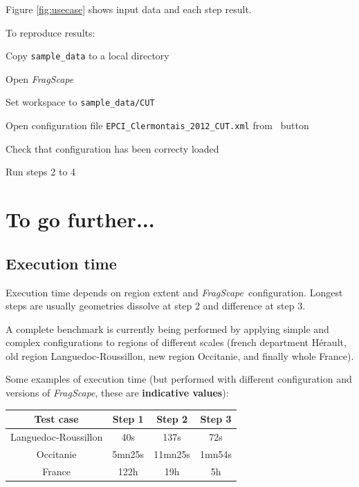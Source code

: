 \documentclass[11pt]{article}
\newcommand{\tool}{\emph{FragScape}}
\let\tempone\itemize
\let\temptwo\enditemize
\renewenvironment{itemize}{\tempone\addtolength{\itemsep}{-0.5\baselineskip}}{\temptwo}
\begin{document}
Figure \ref{fig:usecase} shows input data and each step result.

To reproduce results:
\begin{itemize}
    \item Copy \texttt{sample\_data} to a local directory
    \item Open \tool
    \item Set workspace to \texttt{sample\_data/CUT}
    \item Open configuration file \texttt{EPCI\_Clermontais\_2012\_CUT.xml} from \  button
    \item Check that configuration has been correcty loaded
    \item Run steps 2 to 4
\end{itemize}





\section{To go further...}

\subsection{Execution time}

Execution time depends on region extent and \tool\ configuration. Longest steps are usually geometries dissolve at step 2 and difference at step 3.

A complete benchmark is currently being performed by applying simple and complex configurations to regions of different scales (french department Hérault, old region Languedoc-Roussillon, new region Occitanie, and finally whole France).

Some examples of execution time (but performed with different configuration and versions of \tool, these are \textbf{indicative values}):

\begin{center}
\begin{tabular}{|c|ccc|}
    \hline
    Test case & Step 1 & Step 2 & Step 3 \\
    \hline
    Languedoc-Roussillon & 40s & 137s & 72s \\
    Occitanie & 5mn25s & 11mn25s & 1mn54s \\
    France & 122h & 19h & 5h \\
    \hline
\end{tabular}
\end{center}
\end{document}
